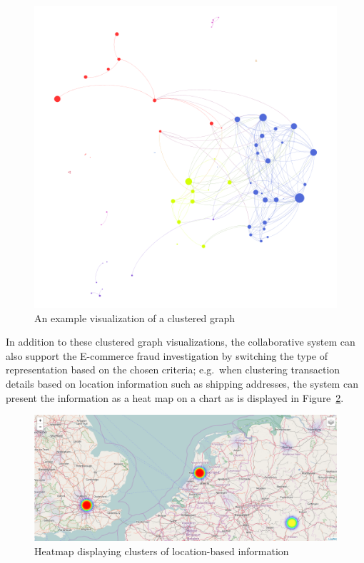 \begin{figure}[H]
  \centering
  \includegraphics[width=0.8\columnwidth]{images/GraphViz.png}
  \caption[An example visualization of a clustered graph]{An example visualization of a clustered graph \citep{griffsgraphs}}
\label{fig:images_graph_viz}
\end{figure}

 In addition to these clustered graph visualizations, the collaborative system can also support the \gls{E-commerce} fraud investigation by switching the type of representation based on the chosen criteria; e.g.\ when clustering transaction details based on location information such as shipping addresses, the system can present the information as a heat map on a chart as is displayed in Figure~\ref{fig:images_map_heatmap}. \@

\begin{figure}[H]
  \centering
  \includegraphics[width=0.9\columnwidth]{images/Heatmap.png}
  \caption{Heatmap displaying clusters of location-based information}
\label{fig:images_map_heatmap}
\end{figure}

